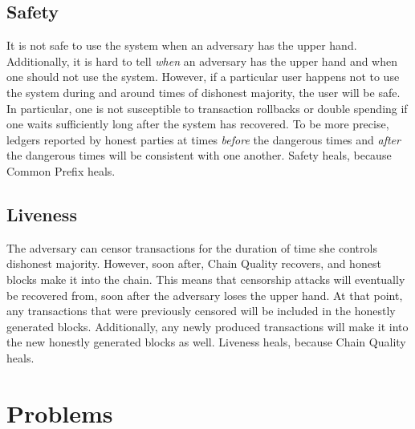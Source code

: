 \subsection*{Safety}
It is not safe to use the system when an adversary has the upper hand. Additionally, it is
hard to tell \emph{when} an adversary has the upper hand and when one should not use the system.
However, if a particular user happens not to use the system during and around times of
dishonest majority, the user will be safe. In particular, one is not susceptible to
transaction rollbacks or double spending if one waits sufficiently long after the system
has recovered. To be more precise, ledgers reported by honest parties at times \emph{before}
the dangerous times and \emph{after} the dangerous times will be consistent with one another.
Safety heals, because Common Prefix heals.

\subsection*{Liveness}
The adversary can censor transactions for the duration of time she controls dishonest majority.
However, soon after, Chain Quality recovers, and honest blocks make it into the chain. This means
that censorship attacks will eventually be recovered from, soon after the adversary loses the upper
hand. At that point, any transactions that were previously censored will be included in the honestly
generated blocks. Additionally, any newly produced transactions will make it into the new honestly
generated blocks as well. Liveness heals, because Chain Quality heals.

\section*{Problems}

